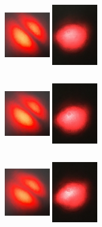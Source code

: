 \documentclass[12pt]{book}
\begin{document}
\begin{figure}[t!]
\begin{subfigure}[b]{0.3\linewidth}
\caption{}
\end{subfigure}
\begin{subfigure}[b]{0.3\linewidth}
\centering
\includegraphics[width=2cm,height=3cm]{images/fotos/61.jpg}
\includegraphics[width=2cm,height=3cm]{images/fotos/62.jpg}
\caption{}
\end{subfigure}
\begin{subfigure}[b]{0.3\linewidth}
\centering
\includegraphics[width=2cm,height=3cm]{images/fotos/71.jpg}
\includegraphics[width=2cm,height=3cm]{images/fotos/52.jpg}
\caption{}
\end{subfigure}
\begin{subfigure}[b]{0.3\linewidth}
\centering
\includegraphics[width=2cm,height=3cm]{images/fotos/81.jpg}
\includegraphics[width=2cm,height=3cm]{images/fotos/42.jpg}

\end{subfigure}
\end{figure}
\end{document}
